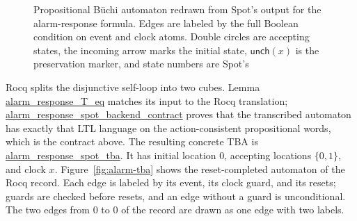\documentclass[manuscript]{acmart}
\newcommand{\Unch}{\mathsf{unch}}
\newcommand{\Rocqid}[1]{\url{#1}}
\begin{document}
\begin{figure}[t]
\centering
{}
\caption{Propositional B\"uchi automaton redrawn from Spot's output for the
alarm-response formula. Edges are labeled by the full Boolean condition on
event and clock atoms. Double circles are accepting states, the incoming arrow
marks the initial state, $\Unch(x)$ is the preservation marker, and state
numbers are Spot's}
\label{fig:alarm-backend}
\end{figure}
Rocq splits the disjunctive self-loop into two cubes. Lemma
\Rocqid{alarm_response_T_eq} matches its input to the Rocq translation;
\Rocqid{alarm_response_spot_backend_contract} proves that the transcribed
automaton has exactly that LTL language on the action-consistent propositional
words, which is the contract above. 
The resulting concrete TBA is \Rocqid{alarm_response_spot_tba}. It has initial
location $0$, accepting locations $\{0,1\}$, and clock $x$.
Figure~\ref{fig:alarm-tba} shows the reset-completed automaton of the Rocq
record. Each edge is labeled by its event, its clock guard, and its resets;
guards are checked before resets, and an edge without a guard is unconditional. The
two edges from $0$ to $0$ of the record are drawn as one edge with two labels.
\end{document}
